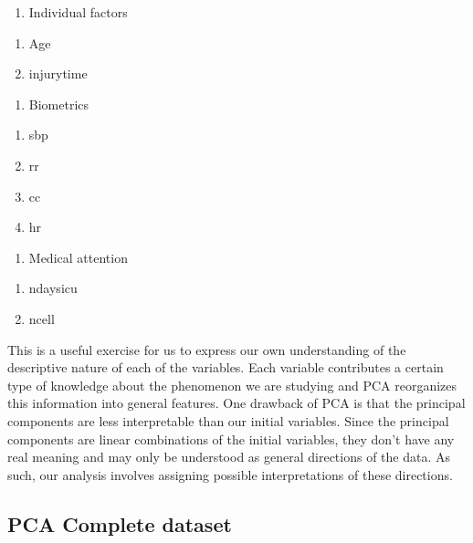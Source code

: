 \documentclass[
]{article}
\providecommand{\tightlist}{%
  \setlength{\itemsep}{0pt}\setlength{\parskip}{0pt}}
\begin{document}
\begin{enumerate}
\def\labelenumi{\arabic{enumi}.}
\tightlist
\item
  Individual factors
\end{enumerate}

\begin{enumerate}
\def\labelenumi{\roman{enumi})}
\tightlist
\item
  Age
\item
  injurytime
\end{enumerate}

\begin{enumerate}
\def\labelenumi{\arabic{enumi}.}
\setcounter{enumi}{1}
\tightlist
\item
  Biometrics
\end{enumerate}

\begin{enumerate}
\def\labelenumi{\roman{enumi})}
\tightlist
\item
  sbp
\item
  rr
\item
  cc
\item
  hr
\end{enumerate}

\begin{enumerate}
\def\labelenumi{\arabic{enumi}.}
\setcounter{enumi}{2}
\tightlist
\item
  Medical attention
\end{enumerate}

\begin{enumerate}
\def\labelenumi{\roman{enumi})}
\tightlist
\item
  ndaysicu
\item
  ncell
\end{enumerate}

This is a useful exercise for us to express our own understanding of the
descriptive nature of each of the variables. Each variable contributes a
certain type of knowledge about the phenomenon we are studying and PCA
reorganizes this information into general features. One drawback of PCA
is that the principal components are less interpretable than our initial
variables. Since the principal components are linear combinations of the
initial variables, they don't have any real meaning and may only be
understood as general directions of the data. As such, our analysis
involves assigning possible interpretations of these directions.

\hypertarget{pca-complete-dataset}{%
\subsection{PCA Complete dataset}\label{pca-complete-dataset}}
\end{document}
